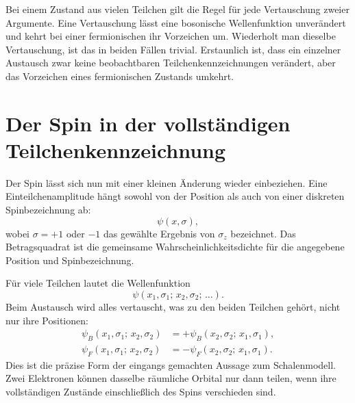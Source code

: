 Bei einem Zustand aus vielen Teilchen gilt die Regel für jede Vertauschung zweier Argumente. Eine Vertauschung lässt eine bosonische Wellenfunktion unverändert und kehrt bei einer fermionischen ihr Vorzeichen um. Wiederholt man dieselbe Vertauschung, ist das in beiden Fällen trivial. Erstaunlich ist, dass ein einzelner Austausch zwar keine beobachtbaren Teilchenkennzeichnungen verändert, aber das Vorzeichen eines fermionischen Zustands umkehrt.

\section{Der Spin in der vollständigen Teilchenkennzeichnung}

Der Spin lässt sich nun mit einer kleinen Änderung wieder einbeziehen. Eine Einteilchenamplitude hängt sowohl von der Position als auch von einer diskreten Spinbezeichnung ab:
\begin{equation}
\psi(x,\sigma),
\end{equation}
wobei \(\sigma=+1\) oder \(-1\) das gewählte Ergebnis von \(\sigma_z\) bezeichnet. Das Betragsquadrat ist die gemeinsame Wahrscheinlichkeitsdichte für die angegebene Position und Spinbezeichnung.

Für viele Teilchen lautet die Wellenfunktion
\begin{equation}
\psi(x_1,\sigma_1;\,x_2,\sigma_2;\,\ldots).
\end{equation}
Beim Austausch wird alles vertauscht, was zu den beiden Teilchen gehört, nicht nur ihre Positionen:
\begin{align}
\psi_B(x_1,\sigma_1;\,x_2,\sigma_2)
&=
+\psi_B(x_2,\sigma_2;\,x_1,\sigma_1),\\
\psi_F(x_1,\sigma_1;\,x_2,\sigma_2)
&=
-\psi_F(x_2,\sigma_2;\,x_1,\sigma_1).
\end{align}
Dies ist die präzise Form der eingangs gemachten Aussage zum Schalenmodell. Zwei Elektronen können dasselbe räumliche Orbital nur dann teilen, wenn ihre vollständigen Zustände einschließlich des Spins verschieden sind.

\begin{classroomqa}
\end{classroomqa}

\begin{classroomqa}
\end{classroomqa}

